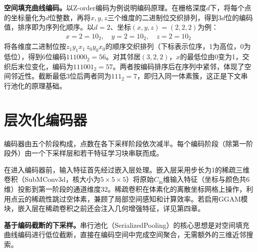 \documentclass[12pt,a4paper,openany,oneside]{ctexbook}
\theoremstyle{definition}
\theoremstyle{remark}
\begin{document}
\textbf{空间填充曲线编码。}以Z-order编码为例说明编码原理。在栅格深度$d$下，将每个点的坐标量化为$d$位整数，再将$x, y, z$三个维度的二进制位交织排列，得到$3d$位的编码值，排序即为序列化顺序。以$d=2$、坐标$(x, y, z)=(2, 2, 2)$为例：
\begin{align*}
x = 2 = 10_2, \quad y = 2 = 10_2, \quad z = 2 = 10_2
\end{align*}
将各维度二进制位按$z_1 y_1 x_1\, z_0 y_0 x_0$的顺序交织排列（下标表示位序，1为高位，0为低位），得到6位编码$111000_2 = 56$。对其邻居$(3, 2, 2)$，$x$的最低位由0变为1，交织后末位变化，编码为$111001_2 = 57$。两者按编码排序后在序列中紧邻，体现了空间邻近性。截断最低3位后两者同为$111_2 = 7$，即归入同一体素簇，这正是下文串行池化的原理基础。

\section{层次化编码器}

编码器由五个阶段构成，点数在各下采样阶段依次减半。每个编码阶段（除第一阶段外）由一个下采样层和若干特征学习块串联而成。

在进入编码器前，输入特征首先经过嵌入层处理。嵌入层采用步长为1的稀疏三维卷积（SubMConv3d，核大小为$5\times5\times5$）将原始$C_{\text{in}}$维输入特征（坐标与颜色共6维）投影到第一阶段的通道维度32。稀疏卷积在体素化的离散坐标网格上操作，利用点云的稀疏性跳过空体素，兼顾了局部空间感知和计算效率。若启用GGAM模块，嵌入层在稀疏卷积之前还会注入几何增强特征，详见第四章。

\textbf{基于编码截断的下采样。}串行池化（SerializedPooling）的核心思想是对空间填充曲线编码进行低位截断，直接在编码空间中完成空间聚合，无需额外的三维近邻搜索。
\end{document}
